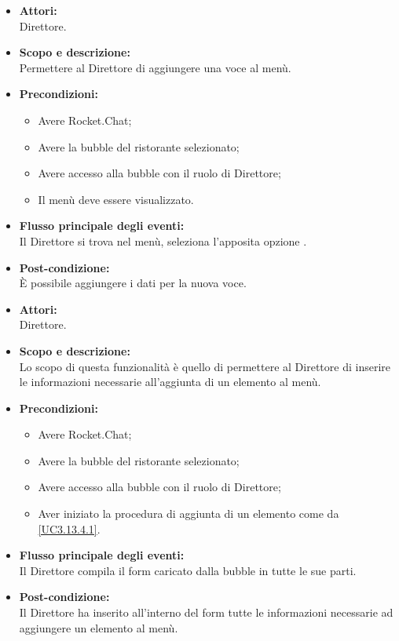
\begin{itemize}
	\item \textbf{Attori:}
	\\Direttore.
	\item \textbf{Scopo e descrizione:} 
	\\Permettere al Direttore di aggiungere una voce al menù.
	\item \textbf{Precondizioni:}
	\begin{itemize}
		\item Avere Rocket.Chat;
		\item Avere la bubble del ristorante selezionato;
		\item Avere accesso alla bubble con il ruolo di Direttore;
		\item Il menù deve essere visualizzato.
	\end{itemize}
	\item \textbf{Flusso principale degli eventi:}
	\\Il Direttore si trova nel menù, seleziona l'apposita opzione .
	\item \textbf{Post-condizione:}
	\\È possibile aggiungere i dati per la nuova voce.
\end{itemize}


\begin{itemize}
	\item \textbf{Attori:}
	\\Direttore.
	\item \textbf{Scopo e descrizione:} 
	\\Lo scopo di questa funzionalità è quello di permettere al Direttore di inserire le informazioni necessarie all'aggiunta di un elemento al menù.
	\item \textbf{Precondizioni:}
	\begin{itemize}
		\item Avere Rocket.Chat;
		\item Avere la bubble del ristorante selezionato;
		\item Avere accesso alla bubble con il ruolo di Direttore;
		\item Aver iniziato la procedura di aggiunta di un elemento come da \ref{UC3.13.4.1}.
	\end{itemize}
	\item \textbf{Flusso principale degli eventi:}
	\\Il Direttore compila il form caricato dalla bubble in tutte le sue parti.
	\item \textbf{Post-condizione:}
	\\Il Direttore ha inserito all'interno del form tutte le informazioni necessarie ad aggiungere un elemento al menù.
\end{itemize}

